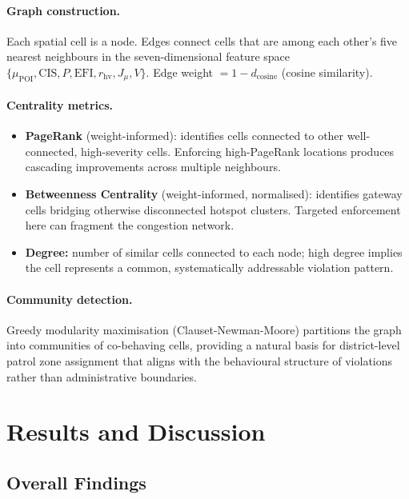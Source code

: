 \documentclass[12pt,a4paper]{article}
\begin{document}
\paragraph{Graph construction.}
Each spatial cell is a node. Edges connect cells that are among each other's five nearest
neighbours in the seven-dimensional feature space
$\{\mu_\mathrm{POI}, \text{CIS}, P, \text{EFI}, r_\mathrm{hv}, J_\mu, V\}$.
Edge weight $= 1 - d_\mathrm{cosine}$ (cosine similarity).

\paragraph{Centrality metrics.}

\begin{itemize}
  \item \textbf{PageRank} (weight-informed): identifies cells connected to other
  well-connected, high-severity cells. Enforcing high-PageRank locations produces
  cascading improvements across multiple neighbours.
  \item \textbf{Betweenness Centrality} (weight-informed, normalised): identifies
  gateway cells bridging otherwise disconnected hotspot clusters. Targeted enforcement
  here can fragment the congestion network.
  \item \textbf{Degree:} number of similar cells connected to each node; high degree
  implies the cell represents a common, systematically addressable violation pattern.
\end{itemize}

\paragraph{Community detection.}
Greedy modularity maximisation (Clauset-Newman-Moore) partitions the graph into communities
of co-behaving cells, providing a natural basis for district-level patrol zone assignment
that aligns with the behavioural structure of violations rather than administrative
boundaries.


\section{Results and Discussion}

\subsection{Overall Findings}
\end{document}
